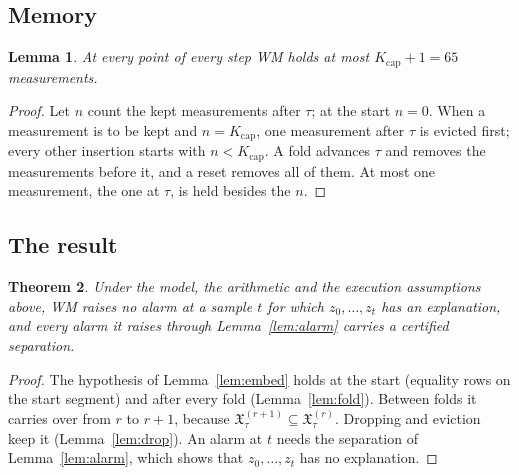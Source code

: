 \documentclass[11pt,a4paper]{article}
\newtheorem{alemma}{Lemma}[section]
\newtheorem{atheorem}[alemma]{Theorem}
\begin{document}
\subsection{Memory}

\begin{alemma}\label{lem:mem}
At every point of every step WM holds at most $K_{\mathrm{cap}} + 1 = 65$ measurements.
\end{alemma}
\begin{proof}
Let $n$ count the kept measurements after $\tau$; at the start $n = 0$. When a measurement is to be kept and
$n = K_{\mathrm{cap}}$, one measurement after $\tau$ is evicted first; every other insertion starts with
$n < K_{\mathrm{cap}}$. A fold advances $\tau$ and removes the measurements before it, and a reset removes all of them.
At most one measurement, the one at $\tau$, is held besides the $n$.
\end{proof}

\subsection{The result}

\begin{atheorem}\label{thm:wm}
Under the model, the arithmetic and the execution assumptions above, WM raises no alarm at a sample $t$ for which
$z_0,\dots,z_t$ has an explanation, and every alarm it raises through
Lemma~\ref{lem:alarm} carries a certified separation.
\end{atheorem}
\begin{proof}
The hypothesis of Lemma~\ref{lem:embed} holds at the start (equality rows on the start segment) and after every fold
(Lemma~\ref{lem:fold}). Between folds it carries over from $r$ to $r+1$, because
$\mathfrak{X}^{(r+1)}_\tau\subseteq\mathfrak{X}^{(r)}_\tau$. Dropping and eviction keep it (Lemma~\ref{lem:drop}). An
alarm at $t$ needs the separation of Lemma~\ref{lem:alarm}, which shows that $z_0,\dots,z_t$ has no explanation.
\end{proof}
\end{document}
